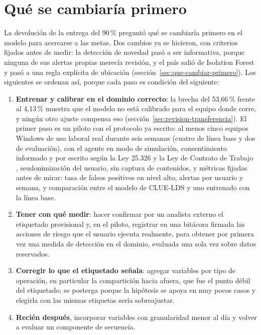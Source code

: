 \section{Qué se cambiaría primero}\label{sec:trabajo-futuro}
La devolución de la entrega del 90\,\% preguntó qué se cambiaría primero en el modelo para acercarse a las metas. Dos cambios ya se hicieron, con criterios fijados antes de medir: la detección de novedad pasó a ser informativa, porque ninguna de sus alertas propias merecía revisión, y el país salió de Isolation Forest y pasó a una regla explícita de ubicación (sección~\ref{sec:que-cambiar-primero}). Los siguientes se ordenan así, porque cada paso es condición del siguiente:
\begin{enumerate}
  \item \textbf{Entrenar y calibrar en el dominio correcto}: la brecha del 53,66\,\% frente al 4,13\,\% muestra que el modelo no está calibrado para el equipo donde corre, y ningún otro ajuste compensa eso (sección~\ref{sec:revision-transferencia}). El primer paso es un piloto con el protocolo ya escrito: al menos cinco equipos Windows de uso laboral real durante seis semanas (cuatro de línea base y dos de evaluación), con el agente en modo de simulación, consentimiento informado y por escrito según la Ley 25.326 \parencite{Ley25326} y la Ley de Contrato de Trabajo \parencite{Ley20744}, seudonimización del usuario, sin captura de contenidos, y métricas fijadas antes de mirar: tasa de falsos positivos en nivel alto, alertas por usuario y semana, y comparación entre el modelo de CLUE-LDS y uno entrenado con la línea base.
  \item \textbf{Tener con qué medir}: hacer confirmar por un analista externo el etiquetado provisional y, en el piloto, registrar en una bitácora firmada las acciones de riesgo que el usuario ejecuta realmente, para obtener por primera vez una medida de detección en el dominio, evaluada una sola vez sobre datos reservados.
  \item \textbf{Corregir lo que el etiquetado señala}: agregar variables por tipo de operación, en particular la compartición hacia afuera, que fue el punto débil del etiquetado; se posterga porque la hipótesis se apoya en muy pocos casos y elegirla con las mismas etiquetas sería sobreajustar.
  \item \textbf{Recién después}, incorporar variables con granularidad menor al día y volver a evaluar un componente de secuencia.
\end{enumerate}

